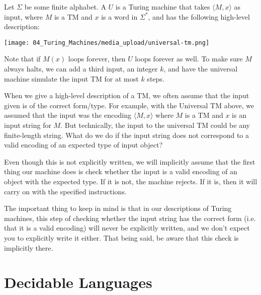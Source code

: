 \begin{definition} \label{definition:Universal-Turing-machine}
Let $\Sigma$ be some finite alphabet. A  $U$ is a Turing machine that takes $\langle M,x \rangle$ as input, where $M$ is a TM and $x$ is a word in $\Sigma^*$, and has the following high-level description:
\begin{center}
    \texttt{[image: 04\_Turing\_Machines/media\_upload/universal-tm.png]}
\end{center}
Note that if $M(x)$ loops forever, then $U$ loops forever as well. To make sure $M$ always halts, we can add a third input, an integer $k$, and have the universal machine simulate the input TM for at most $k$ steps.
\end{definition}


\begin{important} \label{important:Checking-the-input-type}
When we give a high-level description of a TM, we often assume that the input given is of the correct form/type. For example, with the Universal TM above, we assumed that the input was the encoding $\langle M,x \rangle$ where $M$ is a TM and $x$ is an input string for $M$. But technically, the input to the universal TM could be any finite-length string. What do we do if the input string does not correspond to a valid encoding of an expected type of input object?

Even though this is not explicitly written, we will implicitly assume that the first thing our machine does is check whether the input is a valid encoding of an object with the expected type. If it is not, the machine rejects. If it is, then it will carry on with the specified instructions.

The important thing to keep in mind is that in our descriptions of Turing machines, this step of checking whether the input string has the correct form (i.e. that it is a valid encoding) will never be explicitly written, and we don't expect you to explicitly write it either. That being said, be aware that this check is implicitly there.
\end{important}







\section{Decidable Languages}


